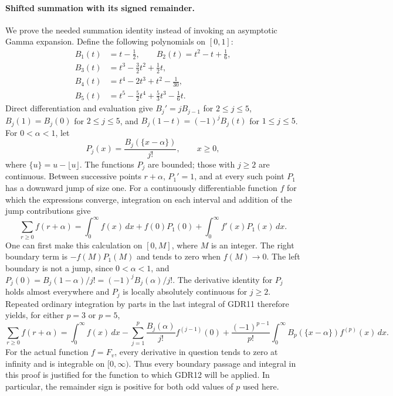\documentclass[11pt,a4paper]{article}
\begin{document}
\paragraph{Shifted summation with its signed remainder.}
We prove the needed summation identity instead of invoking an
asymptotic Gamma expansion. Define the following polynomials on
$[0,1]$:
\[
\begin{aligned}
 B_1(t)&=t-\tfrac12,\qquad
 B_2(t)=t^2-t+\tfrac16,\\
 B_3(t)&=t^3-\tfrac32t^2+\tfrac12t,\\
 B_4(t)&=t^4-2t^3+t^2-\tfrac1{30},\\
 B_5(t)&=t^5-\tfrac52t^4+\tfrac53t^3-\tfrac16t.
\end{aligned}
 \tag{GDR9}
\]
Direct differentiation and evaluation give
$B_j'=jB_{j-1}$ for $2\le j\le5$,
$B_j(1)=B_j(0)$ for $2\le j\le5$, and
$B_j(1-t)=(-1)^jB_j(t)$ for $1\le j\le5$.
For $0<\alpha<1$, let
\[
 P_j(x)=\frac{B_j(\{x-\alpha\})}{j!},\qquad x\ge0,
 \tag{GDR10}
\]
where $\{u\}=u-\lfloor u\rfloor$. The functions $P_j$ are
bounded; those with $j\ge2$ are continuous. Between successive
points $r+\alpha$, $P_1'=1$, and at every such point $P_1$ has
a downward jump of size one. For a continuously differentiable
function $f$ for which the expressions converge, integration on
each interval and addition of the jump contributions give
\[
 \sum_{r\ge0}f(r+\alpha)
 =\int_0^\infty f(x)\,dx
   +f(0)P_1(0)+\int_0^\infty f'(x)P_1(x)\,dx.
 \tag{GDR11}
\]
One can first make this calculation on $[0,M]$, where $M$ is an
integer. The right boundary term is $-f(M)P_1(M)$ and tends to zero
when $f(M)\to0$. The left boundary is not a jump, since
$0<\alpha<1$, and
$P_j(0)=B_j(1-\alpha)/j!=(-1)^jB_j(\alpha)/j!$.
The derivative identity for $P_j$ holds almost everywhere and
$P_j$ is locally absolutely continuous for $j\ge2$. Repeated
ordinary integration by parts in the last integral of GDR11
therefore yields, for either $p=3$ or $p=5$,
\[
 \sum_{r\ge0}f(r+\alpha)
 =\int_0^\infty f(x)\,dx
  -\sum_{j=1}^{p}\frac{B_j(\alpha)}{j!}f^{(j-1)}(0)
  +\frac{(-1)^{p-1}}{p!}
   \int_0^\infty B_p(\{x-\alpha\})f^{(p)}(x)\,dx.
 \tag{GDR12}
\]
For the actual function $f=F_v$, every derivative in question
tends to zero at infinity and is integrable on $[0,\infty)$.
Thus every boundary passage and integral in this proof is justified
for the function to which GDR12 will be applied. In particular,
the remainder sign is positive for both odd values of $p$ used here.
\end{document}
